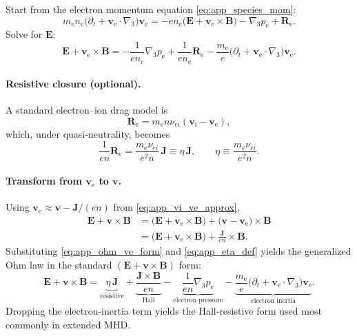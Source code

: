 \documentclass[11pt]{article}
\newcommand{\gradthree}{\nabla_3}
\newcommand{\ion}{\mathrm{i}}
\newcommand{\ele}{\mathrm{e}}
\begin{document}
Start from the electron momentum equation \eqref{eq:app_species_mom}:
\begin{equation}
m_\ele n_\ele\Big(\partial_t + \mathbf{v}_\ele\cdot\gradthree\Big)\mathbf{v}_\ele
=
- e n_\ele\Big(\mathbf{E} + \mathbf{v}_\ele\times\mathbf{B}\Big)
-\gradthree p_\ele
+\mathbf{R}_\ele.
\label{eq:app_electron_mom_again}
\end{equation}
Solve for \(\mathbf{E}\):
\begin{equation}
\mathbf{E} + \mathbf{v}_\ele\times\mathbf{B}
=
-\frac{1}{e n_\ele}\gradthree p_\ele
+\frac{1}{e n_\ele}\mathbf{R}_\ele
-\frac{m_\ele}{e}\Big(\partial_t + \mathbf{v}_\ele\cdot\gradthree\Big)\mathbf{v}_\ele.
\label{eq:app_ohm_ve_form}
\end{equation}

\paragraph{Resistive closure (optional).}
A standard electron--ion drag model is
\begin{equation}
\mathbf{R}_\ele = m_\ele n \nu_{ei}(\mathbf{v}_\ion-\mathbf{v}_\ele),
\label{eq:app_Re_drag}
\end{equation}
which, under quasi-neutrality, becomes
\begin{equation}
\frac{1}{e n}\mathbf{R}_\ele
=
\frac{m_\ele \nu_{ei}}{e^2 n}\,\mathbf{J}
\equiv \eta\,\mathbf{J},
\qquad
\eta \equiv \frac{m_\ele \nu_{ei}}{e^2 n}.
\label{eq:app_eta_def}
\end{equation}

\paragraph{Transform from \(\mathbf{v}_\ele\) to \(\mathbf{v}\).}
Using \(\mathbf{v}_\ele \approx \mathbf{v} - \mathbf{J}/(en)\) from \eqref{eq:app_vi_ve_approx},
\begin{align}
\mathbf{E} + \mathbf{v}\times\mathbf{B}
&=
\Big(\mathbf{E} + \mathbf{v}_\ele\times\mathbf{B}\Big)
+ \Big(\mathbf{v}-\mathbf{v}_\ele\Big)\times\mathbf{B}
\nonumber\\
&=
\Big(\mathbf{E} + \mathbf{v}_\ele\times\mathbf{B}\Big)
+\frac{\mathbf{J}}{en}\times\mathbf{B}.
\label{eq:app_ohm_transform}
\end{align}
Substituting \eqref{eq:app_ohm_ve_form} and \eqref{eq:app_eta_def} yields the generalized
Ohm law in the standard \((\mathbf{E}+\mathbf{v}\times\mathbf{B})\) form:
\begin{equation}
\boxed{
\mathbf{E} + \mathbf{v}\times\mathbf{B}
=
\underbrace{\eta\,\mathbf{J}}_{\text{resistive}}
+
\underbrace{\frac{\mathbf{J}\times\mathbf{B}}{en}}_{\text{Hall}}
-
\underbrace{\frac{1}{en}\gradthree p_\ele}_{\text{electron pressure}}
-
\underbrace{\frac{m_\ele}{e}\Big(\partial_t + \mathbf{v}_\ele\cdot\gradthree\Big)\mathbf{v}_\ele}_{\text{electron inertia}}
}.
\label{eq:app_ohm_general_full}
\end{equation}
Dropping the electron-inertia term yields the Hall-resistive form used most commonly
in extended MHD.
\end{document}
